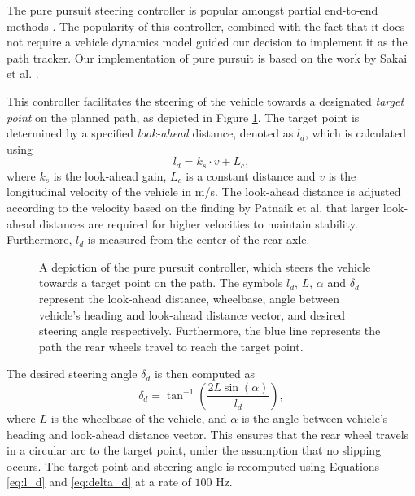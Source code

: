 The pure pursuit steering controller is popular amongst partial end-to-end methods \cite{Evans2021b, Weiss2020}.
The popularity of this controller, combined with the fact that it does not require a vehicle dynamics model guided our decision to implement it as the path tracker.
Our implementation of pure pursuit is based on the work by Sakai et al. \cite{Sakai2018}.


This controller facilitates the steering of the vehicle towards a designated \emph{target point} on the planned path, as depicted in Figure \ref{fig:pure_pursuit}. 
The target point is determined by a specified \emph{look-ahead} distance, denoted as $l_d$, which is calculated using
\begin{equation}\label{eq:l_d}
    l_d = k_s \cdot v + L_{c},
\end{equation}
where $k_s$ is the look-ahead gain, $L_{c}$ is a constant distance and $v$ is the longitudinal velocity of the vehicle in m/s. 
The look-ahead distance is adjusted according to the velocity based on the finding by Patnaik et al. \cite{Patnaik2020} that larger look-ahead distances are required for higher velocities to maintain stability.
Furthermore, $l_d$ is measured from the center of the rear axle.

\begin{figure}[htb!]
    \centering
    
    \caption[A depiction of the pure pursuit controller]{A depiction of the pure pursuit controller, which steers the vehicle towards a target point on the path. The symbols $l_d$, $L$, $\alpha$ and $\delta_{d}$ represent the look-ahead distance, wheelbase, angle between vehicle's heading and look-ahead distance vector, and desired steering angle respectively. Furthermore, the blue line represents the path the rear wheels travel to reach the target point.}
    \label{fig:pure_pursuit}
\end{figure}

The desired steering angle $\delta_d$ is then computed as
\begin{equation}\label{eq:delta_d}
    \delta_d = \tan^{-1} \left( \frac{2L\sin(\alpha)}{l_d} \right),
\end{equation}
where $L$ is the wheelbase of the vehicle, and $\alpha$ is the angle between vehicle's heading and look-ahead distance vector.
This ensures that the rear wheel travels in a circular arc to the target point, under the assumption that no slipping occurs. 
The target point and steering angle is recomputed using Equations \ref{eq:l_d} and \ref{eq:delta_d} at a rate of $100$ Hz.










